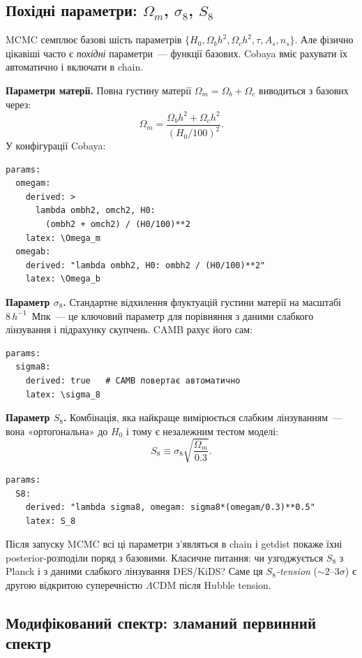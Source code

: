 \subsection{Похідні параметри: $\Omega_m$, $\sigma_8$, $S_8$}

MCMC семплює базові шість параметрів
$\{H_0, \Omega_b h^2, \Omega_c h^2, \tau, A_s, n_s\}$.
Але фізично цікавіші часто є \emph{похідні} параметри~---
функції базових. Cobaya вміє рахувати їх автоматично і
включати в chain.

\textbf{Параметри матерії.} Повна густину матерії
$\Omega_m = \Omega_b + \Omega_c$ виводиться з базових через:
\begin{equation}
  \Omega_m = \frac{\Omega_b h^2 + \Omega_c h^2}{(H_0/100)^2}.
\end{equation}
У конфігурації Cobaya:
\begin{verbatim}
params:
  omegam:
    derived: >
      lambda ombh2, omch2, H0:
        (ombh2 + omch2) / (H0/100)**2
    latex: \Omega_m
  omegab:
    derived: "lambda ombh2, H0: ombh2 / (H0/100)**2"
    latex: \Omega_b
\end{verbatim}

\textbf{Параметр $\sigma_8$.} Стандартне відхилення
флуктуацій густини матерії на масштабі $8\,h^{-1}$~Мпк~---
це ключовий параметр для порівняння з даними слабкого
лінзування і підрахунку скупчень. CAMB рахує його сам:
\begin{verbatim}
params:
  sigma8:
    derived: true   # CAMB повертає автоматично
    latex: \sigma_8
\end{verbatim}

\textbf{Параметр $S_8$.} Комбінація, яка найкраще
вимірюється слабким лінзуванням~--- вона «ортогональна»
до $H_0$ і тому є незалежним тестом моделі:
\begin{equation}
  S_8 \equiv \sigma_8\sqrt{\frac{\Omega_m}{0.3}}.
\end{equation}
\begin{verbatim}
params:
  S8:
    derived: "lambda sigma8, omegam: sigma8*(omegam/0.3)**0.5"
    latex: S_8
\end{verbatim}

Після запуску MCMC всі ці параметри з'являться в chain
і getdist покаже їхні posterior-розподіли поряд з базовими.
Класичне питання: чи узгоджується $S_8$ з Planck і з даними
слабкого лінзування DES/KiDS? Саме ця \emph{$S_8$-tension}
($\sim 2$--$3\sigma$) є другою відкритою суперечністю
$\Lambda$CDM після Hubble tension.

\subsection{Модифікований спектр: зламаний первинний спектр}

